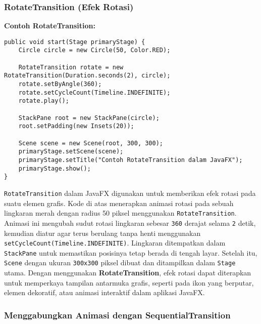 \subsubsection{RotateTransition (Efek Rotasi)}

\textbf{Contoh RotateTransition:}
\begin{lstlisting}[style=JavaStyle, caption=Memutar elemen dalam JavaFX]
public void start(Stage primaryStage) {
	Circle circle = new Circle(50, Color.RED);
	
	RotateTransition rotate = new RotateTransition(Duration.seconds(2), circle);
	rotate.setByAngle(360);
	rotate.setCycleCount(Timeline.INDEFINITE);
	rotate.play();
	
	StackPane root = new StackPane(circle);
	root.setPadding(new Insets(20));
	
	Scene scene = new Scene(root, 300, 300);
	primaryStage.setScene(scene);
	primaryStage.setTitle("Contoh RotateTransition dalam JavaFX");
	primaryStage.show();
}
\end{lstlisting}

\texttt{RotateTransition} dalam JavaFX digunakan untuk memberikan efek rotasi pada suatu elemen grafis. Kode di atas menerapkan animasi rotasi pada sebuah lingkaran merah dengan radius 50 piksel menggunakan \texttt{RotateTransition}. Animasi ini mengubah sudut rotasi lingkaran sebesar \texttt{360} derajat selama \texttt{2} detik, kemudian diatur agar terus berulang tanpa henti menggunakan \texttt{setCycleCount(Timeline.INDEFINITE)}. Lingkaran ditempatkan dalam \texttt{StackPane} untuk memastikan posisinya tetap berada di tengah layar. Setelah itu, \texttt{Scene} dengan ukuran \texttt{300x300} piksel dibuat dan ditampilkan dalam \texttt{Stage} utama. Dengan menggunakan \textbf{RotateTransition}, efek rotasi dapat diterapkan untuk memperkaya tampilan antarmuka grafis, seperti pada ikon yang berputar, elemen dekoratif, atau animasi interaktif dalam aplikasi JavaFX.

\subsubsection{Menggabungkan Animasi dengan SequentialTransition}

